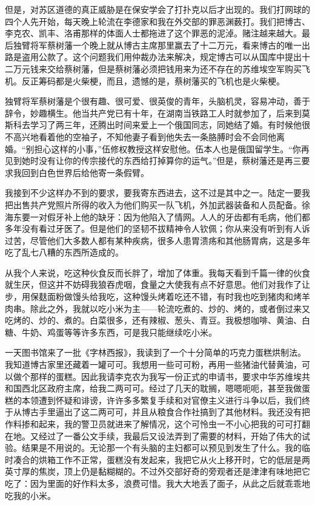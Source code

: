 \documentclass[10pt]{book}
\begin{document}
但是，对苏区道德的真正威胁是在保安学会了打扑克以后才出现的。我们打网球的四个人先开始，每天晚上轮流在李德家和我在外交部的罪恶渊薮打。我们把博古、李克农、凯丰、洛甫那样的体面人士都拖进了这个罪恶的泥淖。赌注越来越大。最后独臂将军蔡树藩一个晚上就从博古主席那里赢去了十二万元，看来博古的唯一出路是盗用公款了。这个问题我们用仲裁办法来解决，规定博古可以从国库中提出十二万元钱来交给蔡树藩，但是蔡树藩必须把钱用来为还不存在的苏维埃空军购买飞机。反正筹码都是火柴梗，而且，遗憾的是，蔡树藩买的飞机也是火柴梗。

独臂将军蔡树藩是个很有趣、很可爱、很英俊的青年，头脑机灵，容易冲动，善于辞令，妙趣横生。他当共产党已有十年，在湖南当铁路工人时就参加了，后来到莫斯科去学习了两三年，还腾出时间来爱上一个俄国同志，同她结了婚。有时候他很不高兴地看着他的空袖子，不知他妻子看到他失去一条胳膊时会不会同他离婚。“别担心这样的小事，”伍修权教授这样安慰他。伍本人也是俄国留学生。“你再见到她时没有让你的传宗接代的东西给打掉算你的运气。”但是，蔡树藩还是再三要求我回到白色世界后给他寄一条假臂。

我接到不少这样办不到的要求，要我寄东西进去，这不过是其中之一。陆定一要我把出售共产党照片所得的收入为他们购买一队飞机，外加武器装备和人员配备。徐海东要一对假牙补上他的缺牙：因为他陷入了情网。人人的牙齿都有毛病，他们都多年没有看过牙医了。但是他们的坚韧不拔精神令人钦佩；你从来没有听到有人诉过苦，尽管他们大多数人都有某种疾病，很多人患胃溃疡和其他肠胃病，这是多年吃了乱七八糟的东西所造成的。

从我个人来说，吃这种伙食反而长胖了，增加了体重。我每天看到千篇一律的伙食就生厌，但这并不妨碍我狼吞虎咽，食量之大使我有点不好意思。他们对我作了让步，用保麸面粉做馒头给我吃，这种馒头烤着吃还不错，有时我也吃到猪肉和烤羊肉串。除此之外，我就以吃小米为主——轮流吃煮的、炒的、烤的，或者倒过来又吃烤的、炒的、煮的。白菜很多，还有辣椒、葱头、青豆。我极想咖啡、黄油、白糖、牛奶、鸡蛋等等许多东西，可是我只能继续吃小米。

一天图书馆来了一批《字林西报》，我读到了一个十分简单的巧克力蛋糕烘制法。我知道博古家里还藏着一罐可可。我想用一些可可粉，再用一些猪油代替黄油，可以做个那样的蛋糕。因此我请李克农为我写一份正式的申请书，要求中华苏维埃共和国西北区政府主席，给我二两可可。经过了几天的耽搁，嗯嗯呃呃，甚至我做蛋糕的本领遭到怀疑和诽谤，许许多多繁复手续和对官僚主义进行斗争以后，我们终于从博古手里逼出了这二两可可，并且从粮食合作社搞到了其他材料。我还没有把作料掺和起来，我的警卫员就进来了解情况，这个可怜虫一不小心把我的可可打翻在地。又经过了一番公文手续，我最后又设法弄到了需要的材料，开始了伟大的试验。结果是不用说的。无论那一个有头脑的主妇都可以预见到发生了什么。我的临时凑合的烘箱工作不正常，蛋糕没有发起来，我把它从火上移开时，它的低层是两英寸厚的焦炭，顶上仍是黏糊糊的。不过外交部好奇的旁观者还是津津有味地把它吃了：因为里面的好作料太多，浪费可惜。我大大地丢了面子，从此之后就乖乖地吃我的小米。
\end{document}
